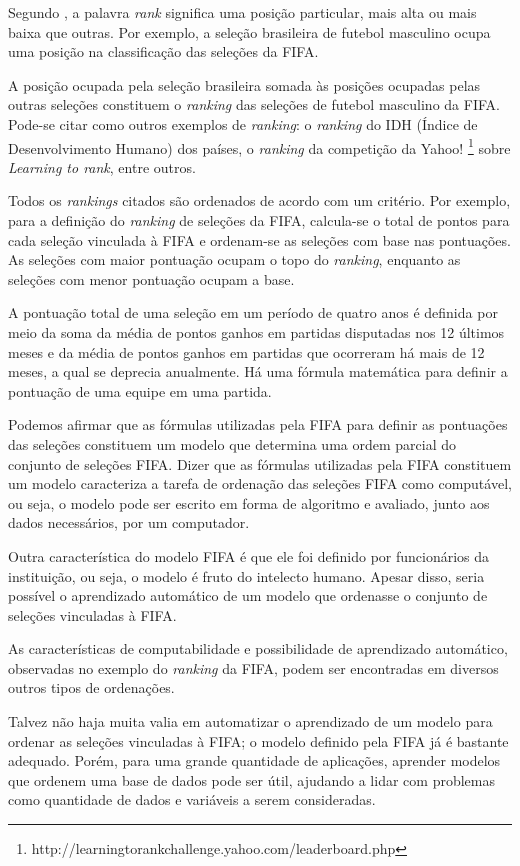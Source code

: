 Segundo \cite{cambridge}, a palavra \emph{rank} significa uma posição particular, mais alta ou mais baixa que outras. Por exemplo, a seleção brasileira de futebol masculino ocupa uma posição na classificação das seleções da FIFA.

A posição ocupada pela seleção brasileira somada às posições ocupadas pelas outras seleções constituem o \emph{ranking} das seleções de futebol masculino da FIFA. Pode-se citar como outros exemplos de \emph{ranking}: o \emph{ranking} do IDH (Índice de Desenvolvimento Humano) dos países, o \emph{ranking} da competição da Yahoo! \footnote{http://learningtorankchallenge.yahoo.com/leaderboard.php} sobre \emph{Learning to rank}, entre outros.

Todos os \emph{rankings} citados são ordenados de acordo com um critério. Por exemplo, para a definição do \emph{ranking} de seleções da FIFA, calcula-se o total de pontos para cada seleção vinculada à FIFA e ordenam-se as seleções com base nas pontuações. As seleções com maior pontuação ocupam o topo do \emph{ranking}, enquanto as seleções com menor pontuação ocupam a base.

A pontuação total de uma seleção em um período de quatro anos é definida por meio da soma da média de pontos ganhos em partidas disputadas nos 12 últimos meses e da média de pontos ganhos em partidas que ocorreram há mais de 12 meses, a qual se deprecia anualmente. Há uma fórmula matemática para definir a pontuação de uma equipe em uma partida.

Podemos afirmar que as fórmulas utilizadas pela FIFA para definir as pontuações das seleções constituem um modelo que determina uma ordem parcial do conjunto de seleções FIFA. Dizer que as fórmulas utilizadas pela FIFA constituem um modelo caracteriza a tarefa de ordenação das seleções FIFA como computável, ou seja, o modelo pode ser escrito em forma de algoritmo e avaliado, junto aos dados necessários, por um computador.

Outra característica do modelo FIFA é que ele foi definido por funcionários da instituição, ou seja, o modelo é fruto do intelecto humano. Apesar disso, seria possível o aprendizado automático de um modelo que ordenasse o conjunto de seleções vinculadas à FIFA.

As características de computabilidade e possibilidade de aprendizado automático, observadas no exemplo do \emph{ranking} da FIFA, podem ser encontradas em diversos outros tipos de ordenações.

Talvez não haja muita valia em automatizar o aprendizado de um modelo para ordenar as seleções vinculadas à FIFA; o modelo definido pela FIFA já é bastante adequado. Porém, para uma grande quantidade de aplicações, aprender modelos que ordenem uma base de dados pode ser útil, ajudando a lidar com problemas como quantidade de dados e variáveis a serem consideradas.

